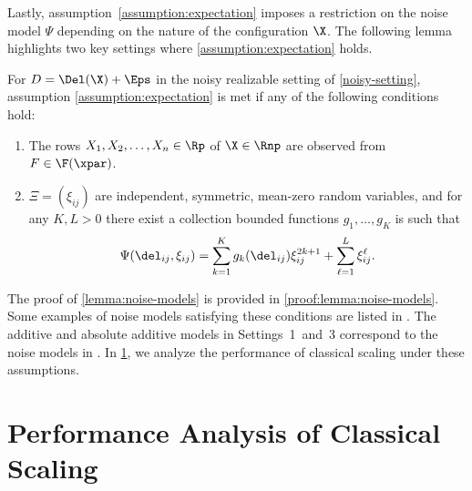 \documentclass[10pt]{article}
\begin{document}
{Lastly, assumption~\ref{assumption:expectation} imposes a restriction on the noise model $\Psi$ depending on the nature of the configuration $\X$. The following lemma highlights two key settings where \ref{assumption:expectation} holds.

\begin{lemma}\label{lemma:noise-models}
    For $D = \Del(\X) + \Eps$ in the noisy realizable setting of \cref{noisy-setting}, assumption \ref{assumption:expectation} is met if any of the following conditions hold:
    \begin{enumerate}[label=\textup{(\roman*)}]
        \item\label{lem:noise-1} The rows $X_1, X_2, \dots, X_n \in \Rp$ of $\X \in \Rnp$ are observed \iid{} from $F \in \F(\xpar)$.
        \item\label{lem:noise-2} $\Xi = (\xi_{ij})$ are independent, symmetric, mean-zero random variables, and for any $K, L > 0$ there exist a collection bounded functions $g_1, \dots, g_{K}$ is such that
        $$
        \Psi(\del_{ij}, \xi_{ij}) = \sum_{k=1}^K g_k(\del_{ij})\xi_{ij}^{2k+1} + \sum_{\ell=1}^{L} \xi_{ij}^{\ell}.
        $$
    \end{enumerate}
\end{lemma}
The proof of \cref{lemma:noise-models} is provided in \cref{proof:lemma:noise-models}. Some examples of noise models satisfying these conditions are listed in . The additive and absolute additive models in Settings~1~and~3 correspond to the noise models in \citet[Sections~2.1~\textit{\&}~2.2]{li2020central}. In \cref{sec:consistency}, we analyze the performance of classical scaling under these assumptions.
}





















\section{Performance Analysis of Classical Scaling}
\label{sec:consistency}
\end{document}
